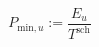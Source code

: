 \begin{equation}
	P_{\text{min},u} := \frac{E_u}{T^\text{sch}}
	\label{ch3:equ:power-charge-minimum}
\end{equation}